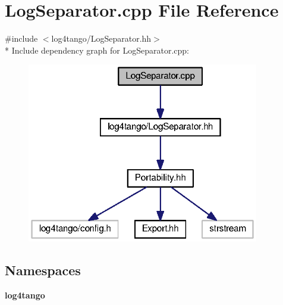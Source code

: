 \section{Log\-Separator.\-cpp File Reference}
\label{LogSeparator_8cpp}
{\ttfamily \#include $<$log4tango/\-Log\-Separator.\-hh$>$}\\*
Include dependency graph for Log\-Separator.\-cpp\-:
\nopagebreak
\begin{figure}[H]
\begin{center}
\leavevmode
\includegraphics[width=287pt]{dc/dac/LogSeparator_8cpp__incl}
\end{center}
\end{figure}
\subsection*{Namespaces}
\begin{DoxyCompactItemize}
\item 
{\bf log4tango}
\end{DoxyCompactItemize}
